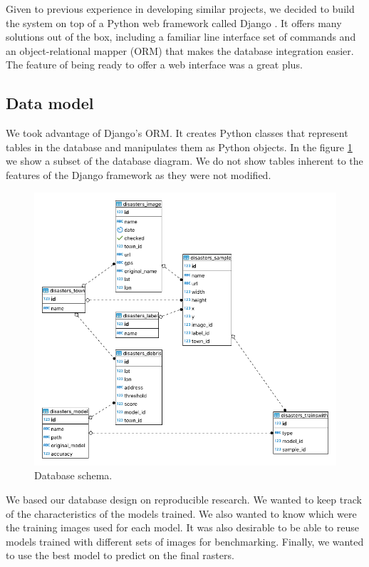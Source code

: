 Given to previous experience in developing similar projects, we decided to build the system on top of a Python web framework called Django \cite{django}. It offers many solutions out of the box, including a familiar line interface set of commands and an object-relational mapper (ORM) that makes the database integration easier. The feature of being ready to offer a web interface was a great plus.\\


\subsection{Data model}

We took advantage of Django's ORM. It creates Python classes that represent tables in the database and manipulates them as Python objects. In the figure \ref{fig:database} we show a subset of the database diagram. We do not show tables inherent to the features of the Django framework as they were not modified.\\

\begin{figure}[!h]
  \centering
  \includegraphics[width=1\textwidth]{images/database.png}
  \caption{Database schema.}
  \label{fig:database}
\end{figure}

We based our database design on reproducible research. We wanted to keep track of the characteristics of the models trained. We also wanted to know which were the training images used for each model. It was also desirable to be able to reuse models trained with different sets of images for benchmarking. Finally, we wanted to use the best model to predict on the final rasters.\\


